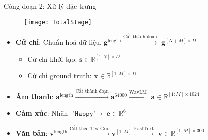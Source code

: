 \begin{frame}{Công đoạn 2: Xử lý đặc trưng}
	
	\begin{figure}
		\texttt{[image: TotalStage]}
	\end{figure}
	
	\begin{itemize}
		\item \textbf{Cử chỉ}: Chuẩn hoá dữ liệu. $\mathbf{g}^{\operatorname{length}} \xrightarrow{ \text{Cắt thành đoạn} }$ $\mathbf{g}^{[N + M] \times D}$
		\begin{itemize}
			\item Cử chỉ khởi tạo: $\mathbf{s} \in \mathbb{R}^{[1:N] \times D}$
			\item Cử chỉ ground truth: $\mathbf{x} \in \mathbb{R}^{[1:M] \times D}$
		\end{itemize}
		
		\item \textbf{Âm thanh}:  $\mathbf{a}^{\operatorname{length}} \xrightarrow{ \text{Cắt thành đoạn} } \mathbf{a}^{64000} \xrightarrow{\text{WavLM} } $ $\mathbf{a} \in \mathbb{R}^{[1:M] \times 1024}$ 
		
		\item \textbf{Cảm xúc}:   Nhãn $\texttt{"Happy"} \rightarrow$ $\mathbf{e} \in \mathbb{R}^{6}$ 
		
		\item \textbf{Văn bản}:  $\mathbf{v}^{\operatorname{length}} \xrightarrow{ \text{Cắt theo TextGrid} } \mathbf{v}^{[1:M]} \xrightarrow{ \text{FastText} } $ $\mathbf{v} \in \mathbb{R}^{[1:M] \times 300}$
	\end{itemize}
	
\end{frame}

